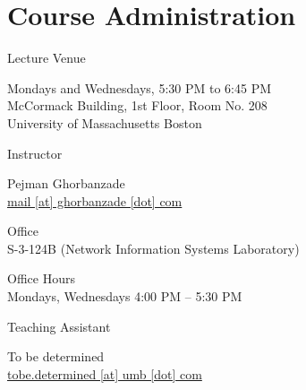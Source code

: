 \documentclass[compress]{beamer}
\begin{document}
\prepareCover

\section{Course Administration}

\begin{slide}
	\begin{block}{Lecture Venue}

	Mondays and Wednesdays, 5:30 PM to 6:45 PM\\
	McCormack Building, 1st Floor, Room No. 208\\
	University of Massachusetts Boston

	\end{block}
\end{slide}

\begin{slide}
	\begin{block}{Instructor}

	Pejman Ghorbanzade\\
	\href{mailto:mail@ghorbanzade.com}{mail [at] ghorbanzade [dot] com}

	\par
	\vspace{0.5em}
	{\large Office}\\S-3-124B (Network Information Systems Laboratory)

	\par
	\vspace{0.5em}
	{\large Office Hours}\\Mondays, Wednesdays 4:00 PM -- 5:30 PM

	\end{block}
\end{slide}

\begin{slide}
	\begin{block}{Teaching Assistant}

	To be determined\\
	\href{mailto:tobe.determined@umb.edu}{tobe.determined [at] umb [dot] com}

	\end{block}
\end{slide}
\end{document}
